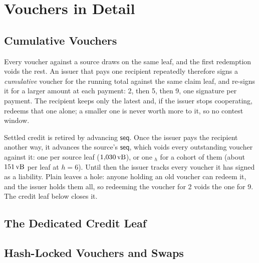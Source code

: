 \section{Vouchers in Detail}\label{app:vouchers}

\subsection{Cumulative Vouchers}\label{app:cumulative}

Every voucher against a source draws on the same leaf, and the first
redemption voids the rest. An issuer that pays one recipient repeatedly
therefore signs a \emph{cumulative} voucher for the running total against
the same claim leaf, and re-signs it for a larger amount at each payment:
2, then 5, then 9, one signature per payment. The recipient keeps only
the latest and, if the issuer stops cooperating, redeems that one alone;
a smaller one is never worth more to it, so no contest window.

Settled credit is retired by advancing $\mathsf{seq}$. Once the issuer
pays the recipient another way, it advances the source's $\mathsf{seq}$, which voids every outstanding
voucher against it: one  per source leaf ($1{,}030\,\mathrm{vB}$), or
one $_h$ for a cohort of them (about $151\,\mathrm{vB}$ per leaf at
$h = 6$). Until then the issuer tracks every voucher it has signed as a
liability. Plain  leaves a hole: anyone holding an old voucher
can redeem it, and the issuer holds them all, so redeeming the voucher
for 2 voids the one for 9. The credit leaf below closes it.

\subsection{The Dedicated Credit Leaf}\label{app:creditleaf}



\subsection{Hash-Locked Vouchers and Swaps}\label{app:hashlock}


